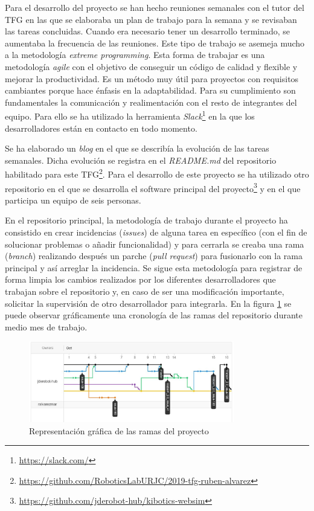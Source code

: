 Para el desarrollo del proyecto se han hecho reuniones semanales con el tutor del TFG en las que se elaboraba un plan de trabajo para la semana y se revisaban las tareas concluidas. Cuando era necesario tener un desarrollo terminado, se aumentaba la frecuencia de las reuniones.\newline
Este tipo de trabajo se asemeja mucho a la metodología \textit{extreme programming}. Esta forma de trabajar es una metodología \textit{agile} con el objetivo de conseguir un código de calidad y flexible y mejorar la productividad. Es un método muy útil para proyectos con requisitos cambiantes porque hace énfasis en la adaptabilidad. 
Para su cumplimiento son fundamentales la comunicación y realimentación con el resto de integrantes del equipo. Para ello se ha utilizado la herramienta \textit{Slack}\footnote{\url{https://slack.com/}} en la que los desarrolladores están en contacto en todo momento.

Se ha elaborado un \textit{blog} en el que se describía la evolución de las tareas semanales. Dicha evolución se registra en el \textit{README.md} del repositorio habilitado para este TFG\footnote{\url{https://github.com/RoboticsLabURJC/2019-tfg-ruben-alvarez}}.
Para el desarrollo de este proyecto se ha utilizado otro repositorio en el que se desarrolla el software principal del proyecto\footnote{\url{https://github.com/jderobot-hub/kibotics-websim}} y en el que participa un equipo de seis personas. 

En el repositorio principal, la metodología de trabajo durante el proyecto ha consistido en crear incidencias (\textit{issues}) de alguna tarea en específico (con el fin de solucionar problemas o añadir funcionalidad) y para cerrarla se creaba una rama (\textit{branch}) realizando después un parche (\textit{pull request}) para fusionarlo con la rama principal y así arreglar la incidencia. Se sigue esta metodología para registrar de forma limpia los cambios realizados por los diferentes desarrolladores que trabajan sobre el repositorio y, en caso de ser una modificación importante, solicitar la supervisión de otro desarrollador para integrarla. En la figura \ref{fig:github} se puede observar gráficamente una cronología de las ramas del repositorio durante medio mes de trabajo.

 \begin{figure}[H]
    \centering
    \includegraphics[width=0.8\textwidth]{img/github.jpg}
    \caption{Representación gráfica de las ramas del proyecto} \label{fig:github}
\end{figure}

